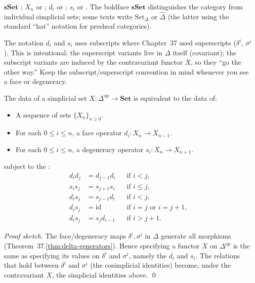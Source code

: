 \begin{howtosay}
$\mathbf{sSet}$ ; $X_n$  or ; $d_i$  or
; $s_i$  or .
The boldface $\mathbf{sSet}$ distinguishes the category from individual
simplicial sets; some texts write $\mathrm{Set}_\Delta$ or
$\widehat{\Delta}$ (the latter using the standard ``hat'' notation for
presheaf categories).
\end{howtosay}

\begin{readernote}
The notation $d_i$ and $s_i$ uses subscripts where Chapter~37 used
superscripts ($\delta^i$, $\sigma^i$). This is intentional: the
superscript variants live in $\Delta$ itself (covariant); the subscript
variants are induced by the contravariant functor $X$, so they ``go the
other way.'' Keep the subscript/superscript convention in mind whenever
you see a face or degeneracy.
\end{readernote}

\begin{theorem}
\label{thm:sset-combinatorial}
The data of a simplicial set $X : \Delta^{\mathrm{op}} \to \mathbf{Set}$ is
equivalent to the data of:
\begin{itemize}
  \item A sequence of sets $\{X_n\}_{n \geq 0}$.
  \item For each $0 \leq i \leq n$, a face operator $d_i : X_n \to X_{n-1}$.
  \item For each $0 \leq i \leq n$, a degeneracy operator $s_i : X_n \to X_{n+1}$.
\end{itemize}
subject to the :
\begin{align*}
  d_i d_j      &= d_{j-1} d_i      & & \text{if } i < j, \\
  s_i s_j      &= s_{j+1} s_i      & & \text{if } i \leq j, \\
  d_i s_j      &= s_{j-1} d_i      & & \text{if } i < j, \\
  d_i s_j      &= \mathrm{id}      & & \text{if } i = j \text{ or } i = j+1, \\
  d_i s_j      &= s_j d_{i-1}      & & \text{if } i > j+1.
\end{align*}
\end{theorem}

\begin{proof}[Proof sketch]
The face/degeneracy maps $\delta^i, \sigma^i$ in $\Delta$ generate all
morphisms (Theorem~37.\ref{thm:delta-generators}). Hence specifying a
functor $X$ on $\Delta^{\mathrm{op}}$ is the same as specifying its values
on $\delta^i$ and $\sigma^i$, namely the $d_i$ and $s_i$. The relations
that hold between $\delta^i$ and $\sigma^i$ (the cosimplicial identities)
become, under the contravariant $X$, the simplicial identities above.
\qed
\end{proof}

